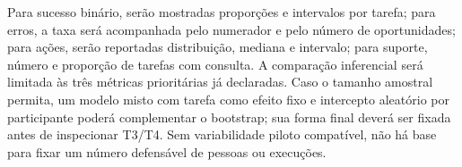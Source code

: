 \documentclass[conference]{IEEEtran}
\begin{document}
Para sucesso binário, serão mostradas proporções e intervalos por tarefa; para erros, a taxa será acompanhada pelo numerador e pelo número de oportunidades; para ações, serão reportadas distribuição, mediana e intervalo; para suporte, número e proporção de tarefas com consulta. A comparação inferencial será limitada às três métricas prioritárias já declaradas. Caso o tamanho amostral permita, um modelo misto com tarefa como efeito fixo e intercepto aleatório por participante poderá complementar o bootstrap; sua forma final deverá ser fixada antes de inspecionar T3/T4. Sem variabilidade piloto compatível, não há base para fixar um número defensável de pessoas ou execuções.


\end{document}
